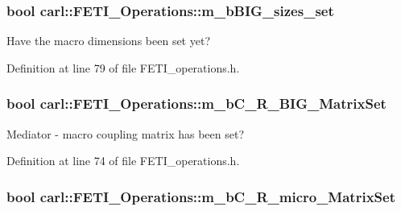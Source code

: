 \subsubsection[{m\+\_\+b\+B\+I\+G\+\_\+sizes\+\_\+set}]{\setlength{\rightskip}{0pt plus 5cm}bool carl\+::\+F\+E\+T\+I\+\_\+\+Operations\+::m\+\_\+b\+B\+I\+G\+\_\+sizes\+\_\+set\hspace{0.3cm}{\ttfamily [protected]}}\label{classcarl_1_1_f_e_t_i___operations_a03d5022fa7da0e04b60c59c3d3cd598a}


Have the macro dimensions been set yet? 



Definition at line 79 of file F\+E\+T\+I\+\_\+operations.\+h.

\hypertarget{classcarl_1_1_f_e_t_i___operations_a2fbc3a5e789caab1c636fdc86304023e}{}
\subsubsection[{m\+\_\+b\+C\+\_\+\+R\+\_\+\+B\+I\+G\+\_\+\+Matrix\+Set}]{\setlength{\rightskip}{0pt plus 5cm}bool carl\+::\+F\+E\+T\+I\+\_\+\+Operations\+::m\+\_\+b\+C\+\_\+\+R\+\_\+\+B\+I\+G\+\_\+\+Matrix\+Set\hspace{0.3cm}{\ttfamily [protected]}}\label{classcarl_1_1_f_e_t_i___operations_a2fbc3a5e789caab1c636fdc86304023e}


Mediator -\/ macro coupling matrix has been set? 



Definition at line 74 of file F\+E\+T\+I\+\_\+operations.\+h.

\hypertarget{classcarl_1_1_f_e_t_i___operations_adc75fb521a7adb09783a446896180e73}{}
\subsubsection[{m\+\_\+b\+C\+\_\+\+R\+\_\+micro\+\_\+\+Matrix\+Set}]{\setlength{\rightskip}{0pt plus 5cm}bool carl\+::\+F\+E\+T\+I\+\_\+\+Operations\+::m\+\_\+b\+C\+\_\+\+R\+\_\+micro\+\_\+\+Matrix\+Set\hspace{0.3cm}{\ttfamily [protected]}}\label{classcarl_1_1_f_e_t_i___operations_adc75fb521a7adb09783a446896180e73}


